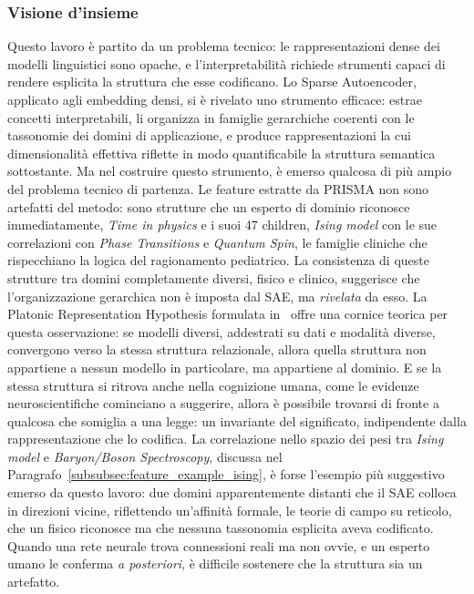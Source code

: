 \subsubsection{Visione d'insieme}
\label{subsubsec:visione_insieme}
Questo lavoro è partito da un problema tecnico: le rappresentazioni dense dei modelli linguistici sono opache, e l'interpretabilità richiede strumenti capaci di rendere esplicita la struttura che esse codificano. Lo Sparse Autoencoder, applicato agli embedding densi, si è rivelato uno strumento efficace: estrae concetti interpretabili, li organizza in famiglie gerarchiche coerenti con le tassonomie dei domini di applicazione, e produce rappresentazioni la cui dimensionalità effettiva riflette in modo quantificabile la struttura semantica sottostante.
Ma nel costruire questo strumento, è emerso qualcosa di più ampio del problema tecnico di partenza. Le feature estratte da PRISMA non sono artefatti del metodo: sono strutture che un esperto di dominio riconosce immediatamente, \textit{Time in physics} e i suoi 47 children, \textit{Ising model} con le sue correlazioni con \textit{Phase Transitions} e \textit{Quantum Spin}, le famiglie cliniche che rispecchiano la logica del ragionamento pediatrico. La consistenza di queste strutture tra domini completamente diversi, fisico e clinico, suggerisce che l'organizzazione gerarchica non è imposta dal SAE, ma \textit{rivelata} da esso.
La Platonic Representation Hypothesis formulata in~\parencite{huh2024platonic} offre una cornice teorica per questa osservazione: se modelli diversi, addestrati su dati e modalità diverse, convergono verso la stessa struttura relazionale, allora quella struttura non appartiene a nessun modello in particolare, ma appartiene al dominio. E se la stessa struttura si ritrova anche nella cognizione umana, come le evidenze neuroscientifiche cominciano a suggerire, allora è possibile trovarsi di fronte a qualcosa che somiglia a una legge: un invariante del significato, indipendente dalla rappresentazione che lo codifica.
La correlazione nello spazio dei pesi tra \textit{Ising model} e \textit{Baryon/Boson Spectroscopy}, discussa nel Paragrafo~\ref{subsubsec:feature_example_ising}, è forse l'esempio più suggestivo emerso da questo lavoro: due domini apparentemente distanti che il SAE colloca in direzioni vicine, riflettendo un'affinità formale, le teorie di campo su reticolo, che un fisico riconosce ma che nessuna tassonomia esplicita aveva codificato. Quando una rete neurale trova connessioni reali ma non ovvie, e un esperto umano le conferma \textit{a posteriori}, è difficile sostenere che la struttura sia un artefatto.
